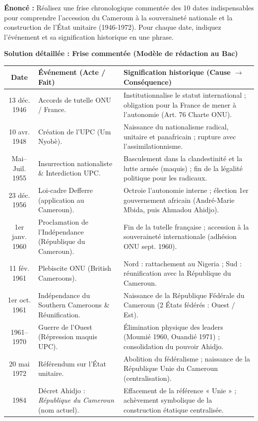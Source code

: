 \documentclass[11pt]{article}
\newcommand{\cle}[1]{{\popxbold\color{popdark}#1}}
\begin{document}
\begin{exoresolu}
\textbf{Énoncé :} Réalisez une frise chronologique commentée des 10 dates indispensables pour comprendre l'accession du Cameroun à la souveraineté nationale et la construction de l'État unitaire (1946-1972). Pour chaque date, indiquez l'événement et sa signification historique en une phrase.

\tcblower
\textbf{Solution détaillée : Frise commentée (Modèle de rédaction au Bac)}

\begin{center}
\begin{tabularx}{\linewidth}{|c|X|X|}\hline
\textbf{Date} & \textbf{\'Evénement (Acte / Fait)} & \textbf{Signification historique (Cause $\rightarrow$ Conséquence)} \\ \hline
\textcolor{poppurple}{13 déc. 1946} & Accords de tutelle ONU / France. & Institutionnalise le statut international ; obligation pour la France de mener à l'autonomie (Art. 76 Charte ONU). \\ \hline
\textcolor{popgreen}{10 avr. 1948} & Création de l'UPC (Um Nyobè). & Naissance du nationalisme radical, unitaire et panafricain ; rupture avec l'assimilationnisme. \\ \hline
\textcolor{poporange}{Mai--Juil. 1955} & Insurrection nationaliste \& Interdiction UPC. & Basculement dans la clandestinité et la lutte armée (maquis) ; fin de la légalité politique pour les radicaux. \\ \hline
\textcolor{popblue}{23 déc. 1956} & Loi-cadre Defferre (application au Cameroun). & Octroie l'autonomie interne ; élection 1er gouvernement africain (André-Marie Mbida, puis Ahmadou Ahidjo). \\ \hline
\textcolor{popblue}{1er janv. 1960} & Proclamation de l'Indépendance (République du Cameroun). & Fin de la tutelle française ; accession à la souveraineté internationale (adhésion ONU sept. 1960). \\ \hline
\textcolor{poppurple}{11 fév. 1961} & Plebiscite ONU (British Cameroons). & Nord : rattachement au Nigeria ; Sud : réunification avec la République du Cameroun. \\ \hline
\textcolor{popblue}{1er oct. 1961} & Indépendance du Southern Cameroons \& Réunification. & Naissance de la \cle{République Fédérale du Cameroun} (2 États fédérés : Ouest / Est). \\ \hline
\textcolor{poporange}{1961--1970} & Guerre de l'Ouest (Répression maquis UPC). & Élimination physique des leaders (Moumié 1960, Ouandié 1971) ; consolidation du pouvoir Ahidjo. \\ \hline
\textcolor{popblue}{20 mai 1972} & Référendum sur l'État unitaire. & Abolition du fédéralisme ; naissance de la \cle{République Unie du Cameroun} (centralisation). \\ \hline
\textcolor{popblue}{1984} & Décret Ahidjo : \textit{République du Cameroun} (nom actuel). & Effacement de la référence « Unie » ; achèvement symbolique de la construction étatique centralisée. \\ \hline
\end{tabularx}
\end{center}


\end{exoresolu}
\end{document}

